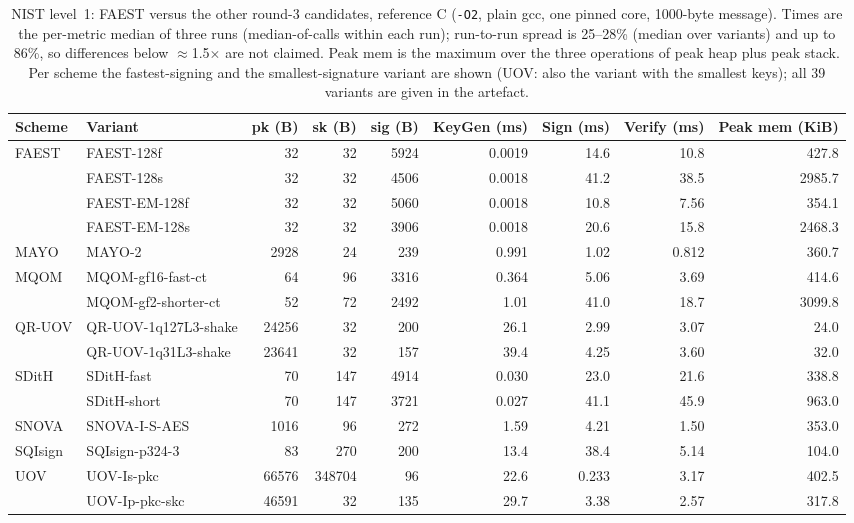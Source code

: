 \begin{table}[t]
\centering
\caption{NIST level~1: FAEST versus the other round-3 candidates, reference C (\texttt{-O2}, plain gcc, one pinned core, 1000-byte message). Times are the per-metric median of three runs (median-of-calls within each run); run-to-run spread is 25--28\% (median over variants) and up to 86\%, so differences below $\approx$1.5$\times$ are not claimed. Peak mem is the maximum over the three operations of peak heap plus peak stack. Per scheme the fastest-signing and the smallest-signature variant are shown (UOV: also the variant with the smallest keys); all 39 variants are given in the artefact.}
\label{tab:l1}
\small
\begin{tabular}{llrrrrrrr}
\toprule
Scheme & Variant & pk (B) & sk (B) & sig (B) & KeyGen (ms) & Sign (ms) & Verify (ms) & Peak mem (KiB) \\
\midrule
FAEST & FAEST-128f & 32 & 32 & 5924 & 0.0019 & 14.6 & 10.8 & 427.8 \\
 & FAEST-128s & 32 & 32 & 4506 & 0.0018 & 41.2 & 38.5 & 2985.7 \\
 & FAEST-EM-128f & 32 & 32 & 5060 & 0.0018 & 10.8 & 7.56 & 354.1 \\
 & FAEST-EM-128s & 32 & 32 & 3906 & 0.0018 & 20.6 & 15.8 & 2468.3 \\
\midrule
MAYO & MAYO-2 & 2928 & 24 & 239 & 0.991 & 1.02 & 0.812 & 360.7 \\
\midrule
MQOM & MQOM-gf16-fast-ct & 64 & 96 & 3316 & 0.364 & 5.06 & 3.69 & 414.6 \\
 & MQOM-gf2-shorter-ct & 52 & 72 & 2492 & 1.01 & 41.0 & 18.7 & 3099.8 \\
\midrule
QR-UOV & QR-UOV-1q127L3-shake & 24256 & 32 & 200 & 26.1 & 2.99 & 3.07 & 24.0 \\
 & QR-UOV-1q31L3-shake & 23641 & 32 & 157 & 39.4 & 4.25 & 3.60 & 32.0 \\
\midrule
SDitH & SDitH-fast & 70 & 147 & 4914 & 0.030 & 23.0 & 21.6 & 338.8 \\
 & SDitH-short & 70 & 147 & 3721 & 0.027 & 41.1 & 45.9 & 963.0 \\
\midrule
SNOVA & SNOVA-I-S-AES & 1016 & 96 & 272 & 1.59 & 4.21 & 1.50 & 353.0 \\
\midrule
SQIsign & SQIsign-p324-3 & 83 & 270 & 200 & 13.4 & 38.4 & 5.14 & 104.0 \\
\midrule
UOV & UOV-Is-pkc & 66576 & 348704 & 96 & 22.6 & 0.233 & 3.17 & 402.5 \\
 & UOV-Ip-pkc-skc & 46591 & 32 & 135 & 29.7 & 3.38 & 2.57 & 317.8 \\
\bottomrule
\end{tabular}
\end{table}
